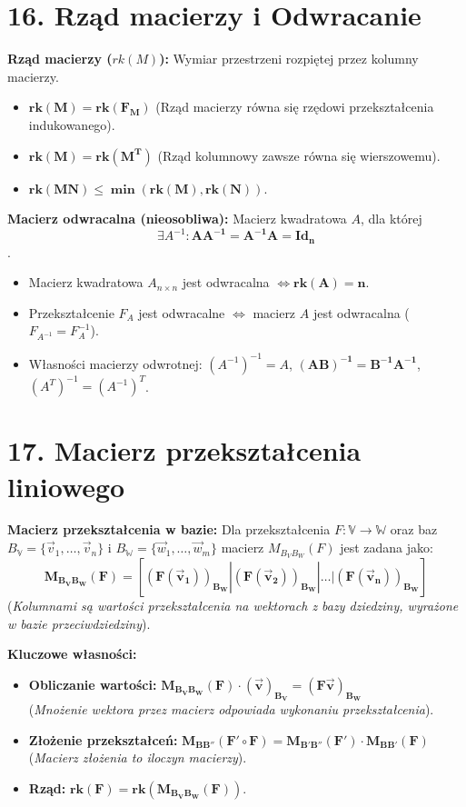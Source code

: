 \documentclass[12pt,a4paper]{article}
\begin{document}
\section*{16. Rząd macierzy i Odwracanie}
\noindent\textbf{Rząd macierzy ($rk(M)$):} Wymiar przestrzeni rozpiętej przez kolumny macierzy.
\begin{itemize}
    \item $\mathbf{rk(M) = rk(F_M)}$ (Rząd macierzy równa się rzędowi przekształcenia indukowanego).
    \item $\mathbf{rk(M) = rk(M^T)}$ (Rząd kolumnowy zawsze równa się wierszowemu).
    \item $\mathbf{rk(MN) \le \min(rk(M), rk(N))}$.
\end{itemize}

\noindent\textbf{Macierz odwracalna (nieosobliwa):} Macierz kwadratowa $A$, dla której $$\exists A^{-1}: \mathbf{A A^{-1} = A^{-1} A = Id_n}$$.
\begin{itemize}
    \item Macierz kwadratowa $A_{n \times n}$ jest odwracalna $\mathbf{\iff rk(A) = n}$.
    \item Przekształcenie $F_A$ jest odwracalne $\iff$ macierz $A$ jest odwracalna ($F_{A^{-1}} = F_A^{-1}$).
    \item Własności macierzy odwrotnej: $(A^{-1})^{-1} = A$, $\mathbf{(AB)^{-1} = B^{-1} A^{-1}}$, $(A^T)^{-1} = (A^{-1})^T$.
\end{itemize}

\section*{17. Macierz przekształcenia liniowego}
\noindent\textbf{Macierz przekształcenia w bazie:} Dla przekształcenia $F: \mathbb{V} \to \mathbb{W}$ oraz baz $B_\mathbb{V} = \{\vec{v}_1, \dots, \vec{v}_n\}$ i $B_\mathbb{W} = \{\vec{w}_1, \dots, \vec{w}_m\}$ macierz $M_{B_V B_W}(F)$ jest zadana jako:
$$ \mathbf{M_{B_V B_W}(F) = [(F(\vec{v}_1))_{B_W} | (F(\vec{v}_2))_{B_W} | \dots | (F(\vec{v}_n))_{B_W}]} $$
(\textit{Kolumnami są wartości przekształcenia na wektorach z bazy dziedziny, wyrażone w bazie przeciwdziedziny}).

\noindent\textbf{Kluczowe własności:}
\begin{itemize}
    \item \textbf{Obliczanie wartości:} $\mathbf{M_{B_V B_W}(F) \cdot (\vec{v})_{B_V} = (F\vec{v})_{B_W}}$ \\
    (\textit{Mnożenie wektora przez macierz odpowiada wykonaniu przekształcenia}).
    \item \textbf{Złożenie przekształceń:} $\mathbf{M_{B B''}(F' \circ F) = M_{B' B''}(F') \cdot M_{B B'}(F)}$ \\
    (\textit{Macierz złożenia to iloczyn macierzy}).
    \item \textbf{Rząd:} $\mathbf{rk(F) = rk(M_{B_V B_W}(F))}$.
\end{itemize}
\end{document}
